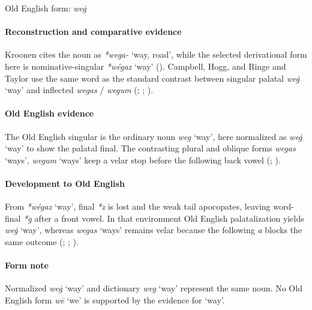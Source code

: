 \documentclass[
  british,
  a4paper,
]{article}
\providecommand{\Recon}[1]{\emph{*#1}}
\begin{document}
Old English form: \emph{weġ}

\paragraph{Reconstruction and comparative
evidence}\label{reconstruction-and-comparative-evidence-68}

Kroonen cites the noun as \emph{*wega-} `way, road', while the selected
derivational form here is nominative-singular \Recon{wégaz} `way'
(). Campbell, Hogg, and Ringe
and Taylor use the same word as the standard contrast between singular
palatal \emph{weġ} `way' and inflected \emph{wegas} / \emph{wegum}
(;
;
).

\paragraph{Old English evidence}\label{old-english-evidence-68}

The Old English singular is the ordinary noun \emph{weg} `way', here
normalized as \emph{weġ} `way' to show the palatal final. The
contrasting plural and oblique forms \emph{wegas} `ways', \emph{wegum}
`ways' keep a velar stop before the following back vowel
(;
).

\paragraph{Development to Old
English}\label{development-to-old-english-68}

From \Recon{wégaz} `way', final \emph{*z} is lost and the weak tail
apocopates, leaving word-final \emph{*g} after a front vowel. In that
environment Old English palatalization yields \emph{weġ} `way', whereas
\emph{wegas} `ways' remains velar because the following \emph{a} blocks
the same outcome (;
;
).

\paragraph{Form note}\label{form-note-25}

Normalized \emph{weġ} `way' and dictionary \emph{weg} `way' represent
the same noun. No Old English form \emph{wē} `we' is supported by the
evidence for `way'.
\end{document}

